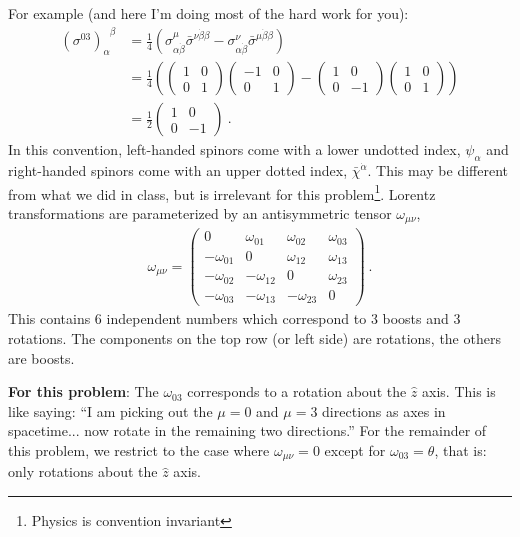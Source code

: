 \documentclass[12pt]{article}
\begin{document}
For example (and here I'm doing most of the hard work for you):
\begin{align}
	\left(\sigma^{03}\right)_\alpha^{\phantom\alpha \beta}
	&= 
	\frac 14 
	\left(
		\sigma^\mu_{\alpha\dot\beta} \bar\sigma^{\nu \dot\beta \beta}
		- 
		\sigma^\nu_{\alpha\dot\beta}\bar\sigma^{\mu \dot\beta \beta}
	\right)
	\\
	&=
	\frac 14 \left(
		\begin{pmatrix}
		 1 &  0\\
		 0 &  1
	\end{pmatrix}
	\begin{pmatrix}
		-1 &  0\\
		 0 &  1
	\end{pmatrix}
	-
	\begin{pmatrix}
		 1 &  0\\
		 0 & -1
	\end{pmatrix}
	\begin{pmatrix}
		1 &  0\\
		 0 &  1
	\end{pmatrix}
	\right) %
	\\
	&=
	\frac 12
	\begin{pmatrix}
		1 &  0\\
		 0 &  -1
	\end{pmatrix}
 \ .
\end{align}
In this convention, left-handed spinors come with a lower undotted index, $\psi_\alpha$ and right-handed spinors come with an upper dotted index, $\bar\chi^{\dot\alpha}$. This may be different from what we did in class, but is irrelevant for this problem\footnote{Physics is convention invariant}. Lorentz transformations are parameterized by an antisymmetric tensor $\omega_{\mu\nu}$,
\begin{align}
	\omega_{\mu\nu} = 
	\begin{pmatrix}
		0 & \omega_{01} & \omega_{02} & \omega_{03} \\
		-\omega_{01} & 0 & \omega_{12} & \omega_{13} \\
		- \omega_{02} & - \omega_{12} & 0 & \omega_{23} \\
		-\omega_{03} & - \omega_{13} & - \omega_{23} & 0
	\end{pmatrix} \ .
\end{align}
This contains 6 independent numbers which correspond to 3 boosts and 3 rotations. The components on the top row (or left side) are rotations, the others are boosts. 
%

\textbf{For this problem}: The $\omega_{03}$ corresponds to a rotation about the $\hat z$ axis. This is like saying: ``I am picking out the $\mu = 0$ and $\mu = 3$ directions as axes in spacetime... now rotate in the remaining two directions.'' For the remainder of this problem, we restrict to the case where $\omega_{\mu\nu} = 0$ except for $\omega_{03} = \theta$, that is: only rotations about the $\hat z$ axis.
\end{document}
